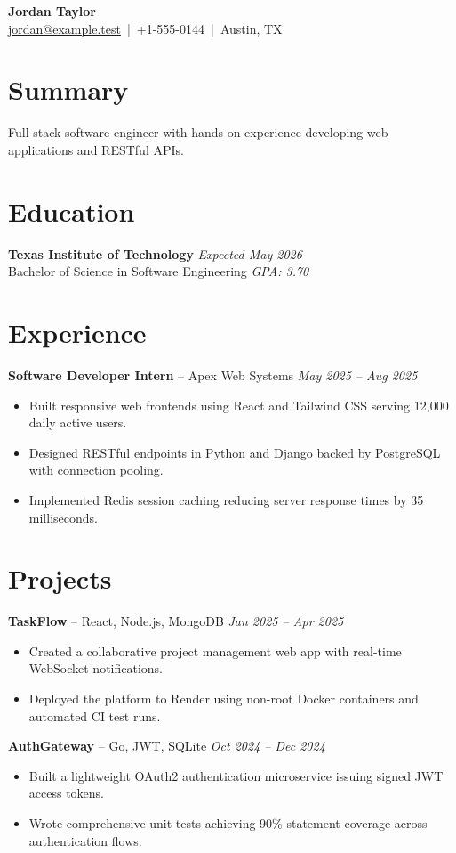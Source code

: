 \documentclass[11pt]{article}
\begin{document}
\begin{center}
{\LARGE \textbf{Jordan Taylor}}\\[4pt]
\href{mailto:jordan@example.test}{jordan@example.test} \,|\, +1-555-0144 \,|\, Austin, TX
\end{center}

\section{Summary}
Full-stack software engineer with hands-on experience developing web applications and RESTful APIs.

\section{Education}
\textbf{Texas Institute of Technology} \hfill \textit{Expected May 2026}\\
Bachelor of Science in Software Engineering \hfill \textit{GPA: 3.70}

\section{Experience}
\textbf{Software Developer Intern} -- Apex Web Systems \hfill \textit{May 2025 -- Aug 2025}
\begin{itemize}
  \item Built responsive web frontends using React and Tailwind CSS serving 12,000 daily active users.
  \item Designed RESTful endpoints in Python and Django backed by PostgreSQL with connection pooling.
  \item Implemented Redis session caching reducing server response times by 35 milliseconds.
\end{itemize}

\section{Projects}
\textbf{TaskFlow} -- React, Node.js, MongoDB \hfill \textit{Jan 2025 -- Apr 2025}
\begin{itemize}
  \item Created a collaborative project management web app with real-time WebSocket notifications.
  \item Deployed the platform to Render using non-root Docker containers and automated CI test runs.
\end{itemize}

\textbf{AuthGateway} -- Go, JWT, SQLite \hfill \textit{Oct 2024 -- Dec 2024}
\begin{itemize}
  \item Built a lightweight OAuth2 authentication microservice issuing signed JWT access tokens.
  \item Wrote comprehensive unit tests achieving 90\% statement coverage across authentication flows.
\end{itemize}
\end{document}
